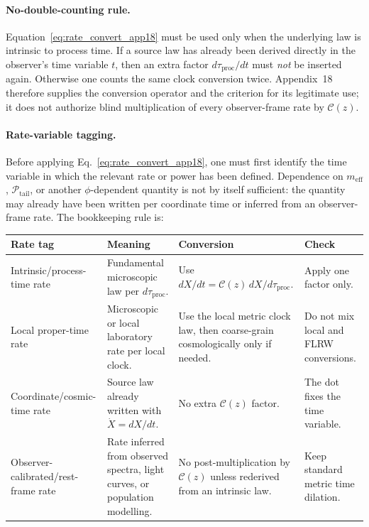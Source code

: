 \documentclass[11pt]{article}
\begin{document}
\paragraph{No-double-counting rule.}
Equation~\eqref{eq:rate_convert_app18} must be used only when the
underlying law is intrinsic to process time.  If a source law has already
been derived directly in the observer's time variable $t$, then an extra
factor $d\tau_{\mathrm{proc}}/dt$ must \emph{not} be inserted again.
Otherwise one counts the same clock conversion twice.  Appendix~18
therefore supplies the conversion operator and the criterion for its
legitimate use; it does not authorize blind multiplication of every
observer-frame rate by $\mathcal{C}(z)$.

\paragraph{Rate-variable tagging.}
Before applying Eq.~\eqref{eq:rate_convert_app18}, one must first identify
the time variable in which the relevant rate or power has been defined.
Dependence on $m_{\mathrm{eff}}$, $\mathcal{P}_{\mathrm{tail}}$, or another
$\phi$-dependent quantity is not by itself sufficient: the quantity may
already have been written per coordinate time or inferred from an
observer-frame rate.  The bookkeeping rule is:
\begin{center}
\small
\begin{tabular}{@{}p{}p{}p{}p{}@{}}
\hline
\textbf{Rate tag} & \textbf{Meaning} & \textbf{Conversion} & \textbf{Check} \\
\hline
Intrinsic/process-time rate &
Fundamental microscopic law per $d\tau_{\mathrm{proc}}$. &
Use $dX/dt=\mathcal{C}(z)\,dX/d\tau_{\mathrm{proc}}$. &
Apply one factor only. \\
Local proper-time rate &
Microscopic or local laboratory rate per local clock. &
Use the local metric clock law, then coarse-grain cosmologically only if needed. &
Do not mix local and FLRW conversions. \\
Coordinate/cosmic-time rate &
Source law already written with $\dot X=dX/dt$. &
No extra $\mathcal{C}(z)$ factor. &
The dot fixes the time variable. \\
Observer-calibrated/rest-frame rate &
Rate inferred from observed spectra, light curves, or population modelling. &
No post-multiplication by $\mathcal{C}(z)$ unless rederived from an intrinsic law. &
Keep standard metric time dilation. \\
\hline
\end{tabular}
\end{center}
\end{document}

